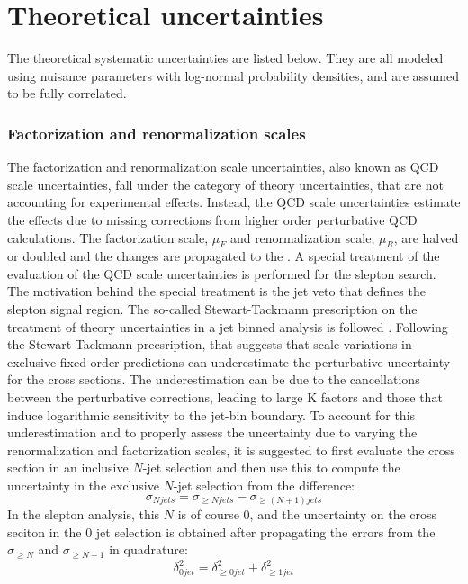 \section{Theoretical uncertainties}
\noindent\justify
The theoretical systematic uncertainties are listed below. 
They are all modeled using nuisance parameters with log-normal probability densities, and are assumed to be fully correlated.
\subsubsection*{Factorization and renormalization scales} 
\noindent\justify
The factorization and renormalization scale uncertainties, also known as QCD scale uncertainties, fall under the category of theory uncertainties, that are not accounting for experimental effects. 
Instead, the QCD scale uncertainties estimate the effects due to missing corrections from higher order perturbative QCD calculations. 
The factorization scale, $\mu_{F}$ and renormalization scale, $\mu_{R}$, are halved or doubled and the changes are propagated to the \ptmiss. 
A special treatment of the evaluation of the QCD scale uncertainties is performed for the slepton search. 
The motivation behind the special treatment is the jet veto that defines the slepton signal region. 
The so-called Stewart-Tackmann prescription on the treatment of theory uncertainties in a jet binned analysis is followed \cite{Stewart:2011cf}. 
Following the Stewart-Tackmann precsription, that suggests that scale variations in exclusive fixed-order predictions can underestimate the perturbative uncertainty for the cross sections. 
The underestimation can be due to the cancellations between the perturbative corrections, leading to large K factors and those that induce logarithmic sensitivity to the jet-bin boundary. 
To account for this underestimation and to properly assess the uncertainty due to varying the renormalization and factorization scales, it is suggested to first evaluate the cross section in an inclusive $N$-jet selection and then use this to compute the uncertainty in the exclusive $N$-jet selection from the difference:
\begin{equation}
    \sigma_{N jets} = \sigma_{\geq N jets} - \sigma_{\geq (N+1) jets}
\end{equation}
In the slepton analysis, this $N$ is of course 0, and the uncertainty on the cross seciton in the 0 jet selection is obtained after propagating the errors from the $ \sigma_{\geq N}$ and
$\sigma_{\geq N+1}$ in quadrature:
\begin{equation}
    \delta_{0 jet}^{2} = \delta_{\geq 0 jet}^{2} + \delta_{\geq 1 jet}^{2}
\end{equation}
